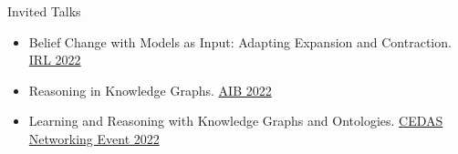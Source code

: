 %

\begin{rSection}{Invited Talks}
    \begin{itemize}
        \item Belief Change with Models as Input: Adapting Expansion and Contraction. \href{https://web.archive.org/web/20221205091252/https://irl.w.uib.no/}{IRL 2022}
        \item Reasoning in Knowledge Graphs. \href{https://researchschool.w.uib.no/}{AIB 2022}
        \item Learning and Reasoning with Knowledge Graphs and Ontologies. \href{https://web.archive.org/web/20221022003238/http://www.uib.no/en/cedas/154942/cedas-networking-event-2022#}{CEDAS Networking Event 2022}
    \end{itemize}
\end{rSection}
